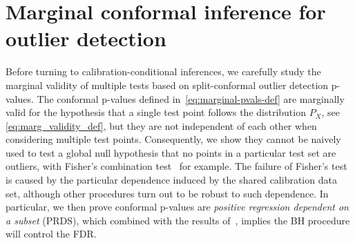 

\section{Marginal conformal inference for outlier detection}
\label{sec:marginal_pvals}

Before turning to calibration-conditional inferences, we carefully study the marginal validity of multiple tests based on split-conformal outlier detection p-values. The conformal p-values defined in~\eqref{eq:marginal-pvals-def} are marginally valid for the hypothesis that a single test point follows the distribution $P_X$, see \eqref{eq:marg_validity_def}, but they are not independent of each other when considering multiple test points. Consequently, we show they cannot be naively used to test a global null hypothesis that no points in a particular test set are outliers, with Fisher's combination test~\cite{fisher1925statistical} for example.
The failure of Fisher's test is caused by the particular dependence induced by the shared calibration data set, although other procedures turn out to be robust to such dependence. In particular, we then prove conformal p-values are \emph{positive regression dependent on a subset} (PRDS), which combined with the results of~\cite{benjamini2001control}, implies the BH procedure will control the FDR.



